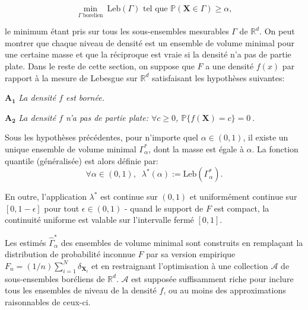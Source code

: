 \documentclass[a4paper, 12pt]{article}
\def\mb{\mathbf}
\def\rset{\mathbb{R}}
\def\leb{\text{Leb}}
\begin{document}
\begin{equation}\label{resume_fr:eq:MV}\min_{\Gamma~ \text{borelien}} ~\leb(\Gamma) \mbox{~tel que~} \mathbb{P}(\mb X \in \Gamma) \ge \alpha,
\end{equation}

le minimum étant pris sur tous les sous-ensembles mesurables $ \Gamma $ de $ \rset^d $.
On peut montrer que chaque niveau de densité est un ensemble de volume minimal pour une certaine masse et que la réciproque est vraie si la densité n'a pas de partie plate.
Dans le reste de cette section, on suppose que $F$ a une densité $ f(x) $ par rapport à la mesure de Lebesgue sur $ \rset^d $ satisfaisant les hypothèses suivantes:

\noindent $\mathbf{A_1}$ {\it La densité $f$ est bornée.}%

\noindent $\mathbf{A_2}$ {\it La densité $f$ n'a pas de partie plate: $\forall c\geq 0$, $\mathbb{P}\{f(\mb X)=c\}=0~.$}

Sous les hypothèses précédentes, pour n'importe quel $\alpha\in (0,1)$, il existe un unique ensemble de volume minimal $\Gamma_\alpha^*$, dont la masse est égale à $\alpha$.
La fonction quantile (généralisée) est alors définie par:
$$
\forall \alpha\in (0,1),\;\; \lambda^*(\alpha) := \leb(\Gamma^*_{\alpha}).
$$

En outre, l'application $ \lambda^* $ est continue sur $(0,1)$ et uniformément continue sur $ [0,1- \epsilon] $ pour tout $ \epsilon \in (0,1) $ - quand le support de $ F $ est compact, la continuité uniforme est valable sur l'intervalle fermé $[0,1] $.


Les estimés $ \widehat {\Gamma}^*_{\alpha} $ des ensembles de volume minimal sont construits en remplaçant la distribution de probabilité inconnue $ F $ par sa version empirique $ F_n = (1 / n) \sum_ {i = 1} ^ N \delta _ {\mb X_i} $ et en restraignant l'optimisation à une collection $ \mathcal{A} $ de sous-ensembles boréliens de $ \rset^d $. $ \mathcal {A} $ est supposée suffisamment riche pour inclure tous les ensembles de niveau de la densité $f$, ou au moins des approximations raisonnables de ceux-ci.
\end{document}
